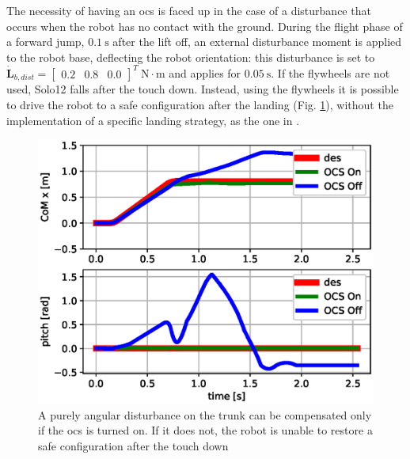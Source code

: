 \documentclass[letterpaper, 10 pt, conference]{ieeeconf}  %
\begin{document}
The necessity of having an \gls{ocs} is faced up in the case of a disturbance that occurs when the robot has no contact with the ground. 
During the flight phase of a forward jump, $0.1~\mathrm{s}$ after the lift off, an external disturbance moment is applied to the robot base, deflecting the robot orientation: this disturbance is set to $\dot{\bm{L}}_{b, dist} = \left[\begin{array}{ccc}
0.2 & 0.8 & 0.0
\end{array}
\right]^T \ \mathrm{N \cdot m}$ and applies for $0.05 \ \mathrm{s}$. 
If the flywheels are not used, Solo12 falls after the touch down. Instead, 
using the flywheels %
it is possible to drive the robot to a safe configuration after the landing (Fig. \ref{fig:fw_jump}), without the implementation of a specific landing strategy, as the one in \cite{jeon2021real}.
\begin{figure}
	\centering
	\includegraphics[width=1\linewidth]{figures/fw_jump.eps}
	\caption{\small A purely angular disturbance on the trunk can be compensated only if the \gls{ocs} is turned on. If it does not, the robot is unable to restore a safe configuration after the touch down}
	\label{fig:fw_jump}
\end{figure}
\end{document}
